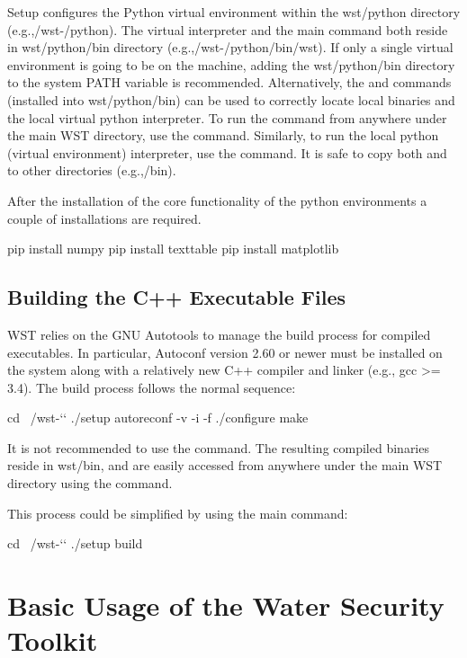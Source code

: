 Setup configures the Python virtual environment within the 
wst/python directory (e.g.,/wst-\wstversion/python). The virtual interpreter and the
main  command both reside in wst/python/bin directory
(e.g.,/wst-\wstversion/python/bin/wst). If only a single virtual environment 
is going to be on the machine, adding the wst/python/bin directory to 
the system PATH variable is recommended. Alternatively, 
the  and  commands (installed
into wst/python/bin) can be used to correctly locate local binaries and
the local virtual python interpreter. To run the  command from anywhere
under the main WST directory, use the  command.
Similarly, to run the local python (virtual environment) interpreter,
use the  command. It is safe to copy both 
and  to other directories (e.g.,/bin).

After the installation of the core functionality of the python environments
a couple of installations are required. 

\begin{unknownListing}
pip install numpy
pip install texttable
pip install matplotlib
\end{unknownListing}

\subsection{Building the C++ Executable Files}

WST relies on the GNU Autotools to manage the build process for compiled
executables. In particular, Autoconf version 2.60 or
newer must be installed on the system along with a relatively new C++ compiler
and linker (e.g., gcc >= 3.4). The build process follows the normal
 sequence:
\begin{unknownListing}
cd ~/wst-`\wstversion`
./setup
autoreconf -v -i -f
./configure
make
\end{unknownListing}
It is not recommended to use the  command. The
resulting compiled binaries reside in wst/bin, and are easily
accessed from anywhere under the main WST directory using the
 command.

This process could be simplified by using the main  command:
\begin{unknownListing}
cd ~/wst-`\wstversion`
./setup build
\end{unknownListing}


\section{Basic Usage of the Water Security Toolkit}\label{usage}

